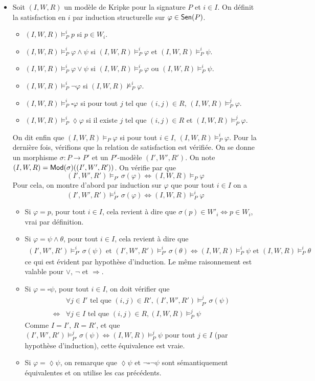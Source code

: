 \documentclass[11pt,a4paper]{article}
\newcommand{\ph}{\varphi}
\newcommand{\itemz}{\item[$\triangleright$]}
\renewcommand{\iff}{\Leftrightarrow}
\newcommand{\info}[1]{\text{{\fontfamily{lmss}\selectfont #1}}}
\newcommand{\Mod}{\info{Mod}}
\newcommand{\Sen}{\info{Sen}}
\newcommand{\1}{\mathbbm{1}}
\begin{document}
\begin{itemize}
\itemz Soit $(I,W,R)$ un modèle de Kripke pour la signature $P$ et $i \in I$. On définit la satisfaction en $i$ par induction structurelle sur $\ph \in \Sen(P)$.
\begin{itemize}
\setlength\itemsep{-0.3em}
\item $(I,W,R) \models^i_P p$ si $p \in W_i$.
\item $(I,W,R) \models^i_P \ph \wedge \psi$ si $(I,W,R) \models^i_P \ph$ et $(I,W,R) \models^i_P \psi$.
\item $(I,W,R) \models^i_P \ph \vee \psi$ si $(I,W,R) \models^i_P \ph$ ou $(I,W,R) \models^i_P \psi$.
\item $(I,W,R) \models^i_P \neg \ph$ si $(I,W,R) \not\models^i_P \ph$.
\item $(I,W,R) \models^i_P \square \ph$ si pour tout $j$ tel que $(i,j) \in R$, $(I,W,R) \models^j_P \ph$.
\item $(I,W,R) \models^i_P \lozenge \ph$ si il existe $j$ tel que $(i,j) \in R$ et $(I,W,R) \models^j_P \ph$.
\end{itemize}
On dit enfin que $(I,W,R) \models_P \ph$ si pour tout $i \in I$, $(I,W,R) \models^i_P \ph$. Pour la dernière fois, vérifions que la relation de satisfaction est vérifiée. On se donne un morphisme $\sigma : P \to P'$ et un $P'$-modèle $(I',W',R')$. On note $(I,W,R) = \Mod(\sigma)((I',W',R'))$. On vérifie par que 
\[ (I',W',R') \models_{P'} \sigma(\ph) \iff (I,W,R) \models_P \ph \]
Pour cela, on montre d'abord par induction sur $\ph$ que pour tout $i \in I$ on a 
\[ (I',W',R') \models^i_{P'} \sigma(\ph) \iff (I,W,R) \models^i_P \ph \]
\begin{itemize}
\setlength\itemsep{-0.3em}
\item Si $\ph = p$, pour tout $i \in I$, cela revient à dire que $\sigma(p) \in W'_i \iff p \in W_i$, vrai par définition.
\item Si $\ph = \psi \wedge \theta$, pour tout $i \in I$, cela revient à dire que 
\begin{align*} (I',W',R') \models^i_{P'} \sigma(\psi) \text{ et } (I',W',R') \models^i_{P'} \sigma(\theta) \iff (I,W,R) \models^i_P \psi \text{ et } (I,W,R) \models^i_P \theta
\end{align*}
ce qui est évident par hypothèse d'induction. Le même raisonnement est valable pour $\vee$, $\neg$ et $\Rightarrow$.
\item Si $\ph = \square \psi$, pour tout $i \in I$, on doit vérifier que
\begin{align*} & \forall j \in I' \text{ tel que } (i,j) \in R', (I',W',R') \models^j_{P'} \sigma(\psi) \\ \iff & \forall j \in I \text{ tel que } (i,j) \in R, (I,W,R) \models^j_P \psi
\end{align*}
Comme $I = I'$, $R = R'$, et que $(I',W',R') \models^j_{P'} \sigma(\psi) \iff (I,W,R) \models^j_{P} \psi$ pour tout $j \in I$ (par hypothèse d'induction), cette équivalence est vraie.
\item Si $\ph = \lozenge \psi$, on remarque que $\lozenge \psi$ et $\neg \square \neg \psi$ sont sémantiquement équivalentes et on utilise les cas précédents.
\end{itemize}
\end{itemize}
\end{document}
